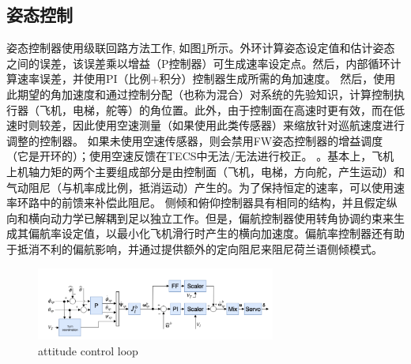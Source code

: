 \documentclass[UTF8,a4paper,10pt,nocolorlinks]{ctexart}
\begin{document}
        \subsection{姿态控制}
        姿态控制器使用级联回路方法工作, 如图\ref{atti}所示。外环计算姿态设定值和估计姿态之间的误差，该误差乘以增益（P控制器）可生成速率设定点。然后，内部循环计算速率误差，并使用PI（比例+积分）控制器生成所需的角加速度。
然后，使用此期望的角加速度和通过控制分配（也称为混合）对系统的先验知识，计算控制执行器（飞机，电梯，舵等）的角位置。此外，由于控制面在高速时更有效，而在低速时则较差，因此使用空速测量（如果使用此类传感器）来缩放针对巡航速度进行调整的控制器。
如果未使用空速传感器，则会禁用FW姿态控制器的增益调度（它是开环的）；使用空速反馈在TECS中无法/无法进行校正。
。基本上，飞机上机轴力矩的两个主要组成部分是由控制面（飞机，电梯，方向舵，产生运动）和气动阻尼（与机率成比例，抵消运动）产生的。为了保持恒定的速率，可以使用速率环路中的前馈来补偿此阻尼。
侧倾和俯仰控制器具有相同的结构，并且假定纵向和横向动力学已解耦到足以独立工作。但是，偏航控制器使用转角协调约束来生成其偏航率设定值，以最小化飞机滑行时产生的横向加速度。偏航率控制器还有助于抵消不利的偏航影响，并通过提供额外的定向阻尼来阻尼荷兰语侧倾模式。
        \begin{figure}[t]
            \centering
            \includegraphics[width=0.7\textwidth]{picture/attitude.png}
            \caption{attitude control loop}
            \label{atti}
        \end{figure}
\end{document}
